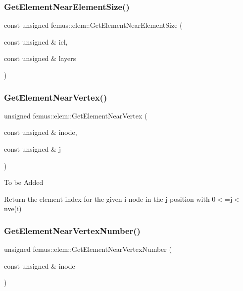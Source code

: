\mbox{\label{classfemus_1_1elem_ae8d034134302cca3460a8eacd5867fdf}} 
\subsubsection{\texorpdfstring{Get\+Element\+Near\+Element\+Size()}{GetElementNearElementSize()}}
{\footnotesize\ttfamily const unsigned femus\+::elem\+::\+Get\+Element\+Near\+Element\+Size (\begin{DoxyParamCaption}\item[{const unsigned \&}]{iel,  }\item[{const unsigned \&}]{layers }\end{DoxyParamCaption})\hspace{0.3cm}{\ttfamily [inline]}}

\mbox{\label{classfemus_1_1elem_a71c390f8dbc0e9fa9fda3810ba059d38}} 
\subsubsection{\texorpdfstring{Get\+Element\+Near\+Vertex()}{GetElementNearVertex()}}
{\footnotesize\ttfamily unsigned femus\+::elem\+::\+Get\+Element\+Near\+Vertex (\begin{DoxyParamCaption}\item[{const unsigned \&}]{inode,  }\item[{const unsigned \&}]{j }\end{DoxyParamCaption})}

To be Added

Return the element index for the given i-\/node in the j-\/position with 0$<$=j$<$nve(i) \mbox{\label{classfemus_1_1elem_a40bb07b110debe3fb6b0f6fc3586e7f3}} 
\subsubsection{\texorpdfstring{Get\+Element\+Near\+Vertex\+Number()}{GetElementNearVertexNumber()}}
{\footnotesize\ttfamily unsigned femus\+::elem\+::\+Get\+Element\+Near\+Vertex\+Number (\begin{DoxyParamCaption}\item[{const unsigned \&}]{inode }\end{DoxyParamCaption})}

